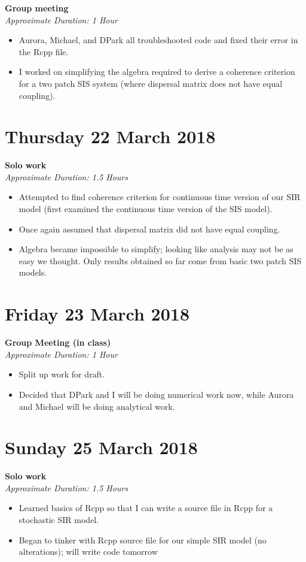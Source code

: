 \documentclass[12pt]{article}\usepackage[]{graphicx}\usepackage[]{color}
\begin{document}
\textbf{Group meeting} \\
\emph{Approximate Duration: 1 Hour}
\begin{itemize}
\item Aurora, Michael, and DPark all troubleshooted code and fixed their error in the Rcpp file.
\item I worked on simplifying the algebra required to derive a coherence criterion for a two patch SIS system (where dispersal matrix does not have equal coupling).
\end{itemize}

\section*{Thursday 22 March 2018}

\textbf{Solo work} \\
\emph{Approximate Duration: 1.5 Hours}
\begin{itemize}
\item Attempted to find coherence criterion for continuous time version of our SIR model (first examined the continuous time version of the SIS model).
\item Once again assumed that dispersal matrix did not have equal coupling.
\item Algebra became impossible to simplify; looking like analysis may not be as easy we thought. Only results obtained so far come from basic two patch SIS models.
\end{itemize}

\section*{Friday 23 March 2018}

\textbf{Group Meeting (in class)} \\
\emph{Approximate Duration: 1 Hour}

\begin{itemize}
\item Split up work for draft.
\item Decided that DPark and I will be doing numerical work now, while Aurora and Michael will be doing analytical work.
\end{itemize}

\section*{Sunday 25 March 2018}

\textbf{Solo work} \\
\emph{Approximate Duration: 1.5 Hours}
\begin{itemize}
\item Learned basics of Rcpp so that I can write a source file in Rcpp for a stochastic SIR model.
\item Began to tinker with Rcpp source file for our simple SIR model (no alterations); will write code tomorrow
\end{itemize}
\end{document}
